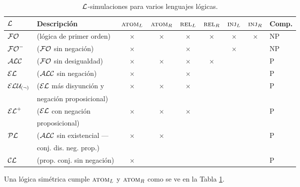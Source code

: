 \begin{table}[t]

\begin{tabular}{|l|l|cccccc|l|}
\hline
  $\mathcal{L}$ & Descripci\'on &$\textsc{atom}_L$ & $\textsc{atom}_R$ & $\textsc{rel}_L$ & $\textsc{rel}_R$ & $\textsc{inj}_L\space$ & $\textsc{inj}_R\space$ & Comp.\\
  \hline
  $\mathcal{FO}$ & (l\'ogica de primer orden)  & $\times$ & $\times$ & $\times$ & $\times$ & $\times$ & $\times$ & NP\\ \hline
  ${\mathcal{FO}^-}$ & ($\mathcal{FO}$ sin negaci\'on) & $\times$ & & $\times$ && $\times$ & & NP\\ \hline 
  $\mathcal{ALC}$   & ($\mathcal{FO}$ sin desigualdad) & $\times$ & $\times$ & $\times$ & $\times$&& & P\\ \hline
  $\mathcal{EL}$   & ($\mathcal{ALC}$ sin negaci\'on) & $\times$ & &  $\times$ & & & &P\\ \hline
	$\mathcal{ELU_{(\neg)} }$ & ($\mathcal{EL}$ m\'as disyunci\'on y  & $\times$ & $\times$ &  $\times$ & & & &P\\ 
	&negaci\'on proposicional)&&&&&&&\\ \hline
  ${\mathcal{EL}^+}$ & ($\mathcal{EL}$ con negaci\'on & $\times$ & $\times$ &  $\times$ & & & &P\\ 
	&proposicional) &&&&&&& \\ \hline
	$\mathcal{PL}$ & ($\mathcal{ALC}$ sin existencial --- & $\times$ & $\times$ & & & & &P\\ 
	&conj. dis. neg. prop.)&&&&&&&\\ \hline
	$\mathcal{CL}$ & (prop. conj. sin negaci\'on)& $\times$ &  &  & & & &P\\ 
	
\hline	
\end{tabular}

\caption{$\mathcal{L}$-simulaciones para varios lenguajes l\'ogicas.}\label{tab:simuls}
\end{table}


Una l\'ogica sim\'etrica cumple  $\textsc{atom}_L$ y $\textsc{atom}_R$ como se ve en la Tabla \ref{tab:simuls}. 


